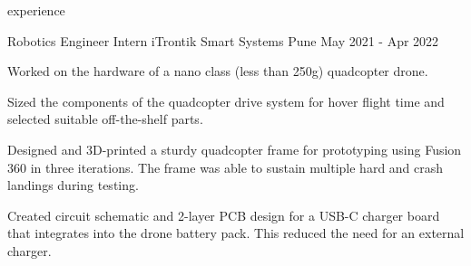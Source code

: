 \begin{section}{experience}



  \begin{work}
    {Robotics Engineer Intern}
    {iTrontik Smart Systems}
    {Pune}
    {May 2021 - Apr 2022}

    \item Worked on the hardware of a nano class (less than 250g) quadcopter
          drone.

    \item Sized the components of the quadcopter drive system for hover flight
          time and selected suitable off-the-shelf parts.

    \item Designed and 3D-printed a sturdy quadcopter frame for prototyping
          using Fusion 360 in three iterations. The frame was able to sustain
          multiple hard and crash landings during testing.

    \item Created circuit schematic and 2-layer PCB design for a USB-C charger
          board that integrates into the drone battery pack. This reduced the
          need for an external charger.

  \end{work}

\end{section}
